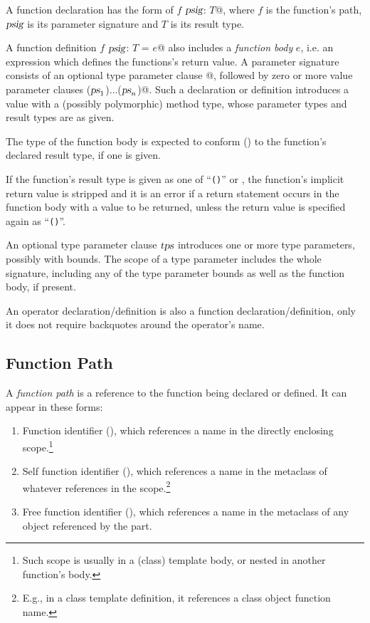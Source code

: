 A function declaration has the form of \lstinline@def $f$ $\mbox{\sl psig}$: $T$@, where $f$ is the function's path, $\mbox{\sl psig}$ is its parameter signature and $T$ is its result type. 

A function definition \lstinline@method $f$ $\mbox{\sl psig}$: $T$ = $e$@ also includes a {\em function body} $e$, i.e. an expression which defines the functions's return value. A parameter signature consists of an optional type parameter clause \lstinline@[$\tps$]@, followed by zero or more value parameter clauses \lstinline@($\mbox{\sl ps}_1$)$\ldots$($\mbox{\sl ps}_n$)@. Such a declaration or definition introduces a value with a (possibly polymorphic) method type, whose parameter types and result types are as given. 

The type of the function body is expected to conform () to the function's declared result type, if one is given. 

If the function's result type is given as one of ``\lstinline!()!'' or , the function's implicit return value is stripped and it is an error if a return statement occurs in the function body with a value to be returned, unless the return value is specified again as ``\lstinline!()!''.

An optional type parameter clause $\tps$ introduces one or more type parameters, possibly with bounds. The scope of a type parameter includes the whole signature, including any of the type parameter bounds as well as the function body, if present. 

An operator declaration/definition is also a function declaration/definition, only it does not require backquotes around the operator's name. 





\subsection{Function Path}

A {\em function path} is a reference to the function being declared or defined. It can appear in these forms:

\begin{enumerate}
  \item Function identifier (), which references a name in the directly enclosing scope.\footnote{Such scope is usually in a (class) template body, or nested in another function's body.}
  \item Self function identifier (), which references a name in the metaclass of whatever  references in the scope.\footnote{E.g., in a class template definition, it references a class object function name.} 
  \item Free function identifier (), which references a name in the metaclass of any object referenced by the  part.
\end{enumerate}





